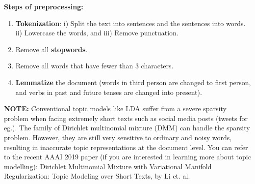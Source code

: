 \documentclass[addpoints,11pt,a4paper]{exam}
\begin{document}

\textbf{Steps of preprocessing:}
\begin{enumerate}
    \item \textbf{Tokenization}: i) Split the text into sentences and the sentences into words. ii) Lowercase the words, and iii) Remove punctuation.
    \item Remove all \textbf{stopwords}.
    \item Remove all words that have fewer than 3 characters.
    \item \textbf{Lemmatize} the document (words in third person are changed to first person, and verbs in past and future tenses are changed into present).
\end{enumerate}

\textbf{NOTE:}
Conventional topic models like LDA suffer from a severe sparsity problem when facing extremely short texts such as social media  posts (tweets for eg.). The family of Dirichlet multinomial mixture (DMM) can handle the sparsity problem. However, they are still very sensitive to ordinary and noisy words, resulting in inaccurate topic representations at the document level. You can refer to the recent AAAI 2019 paper (if you are interested in learning more about topic modelling): Dirichlet Multinomial Mixture with Variational Manifold Regularization: Topic Modeling over Short Texts, by Li et. al.
\end{document}
